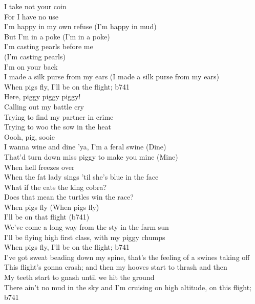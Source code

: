 I take not your coin \\
For I have no use \\
I'm happy in my own refuse (I'm happy in mud) \\

But I'm in a poke (I'm in a poke) \\
I'm casting pearls before me \\
(I'm casting pearls) \\
I'm on your back \\
I made a silk purse from my ears (I made a silk purse from my ears) \\

When pigs fly, I'll be on the flight; b741 \\

Here, piggy piggy piggy! \\

Calling out my battle cry \\
Trying to find my partner in crime \\
Trying to woo the sow in the heat \\
Oooh, pig, sooie \\

I wanna wine and dine 'ya, I'm a feral swine (Dine) \\
That'd turn down miss piggy to make you mine (Mine) \\

When hell freezes over \\
When the fat lady sings 'til she's blue in the face \\
What if the  eats the king cobra? \\
Does that mean the turtles win the race? \\

When pigs fly (When pigs fly) \\
I'll be on that flight (b741) \\

We've come a long way from the sty in the farm sun \\
I'll be flying high first class, with my piggy chumps \\

When pigs fly, I'll be on the flight; b741 \\

I've got sweat beading down my spine, that's the feeling of a swines taking off \\
This flight's gonna crash; and then my hooves start to thrash and then \\
My teeth start to gnash until we hit the ground \\
There ain't no mud in the sky and I'm cruising on high altitude, on this flight; b741 \\

